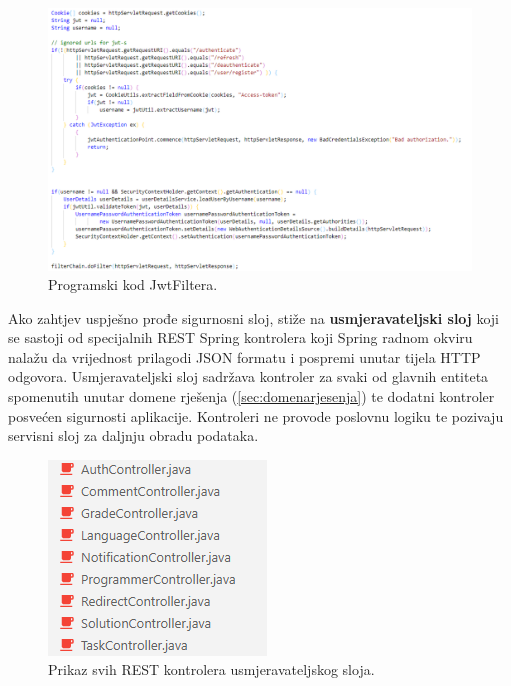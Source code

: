 \documentclass[times, utf8, zavrsni, numeric]{fer}
\begin{document}
	 		\begin{figure}[H]
	 			\centering
	 			\includegraphics[width=\linewidth]{pictures/prikazi/JwtFilter.png}
	 			\caption{Programski kod JwtFiltera.}
	 			\label{fig:jwtfilter}
	 		\end{figure}
 		
	 		Ako zahtjev uspješno prođe sigurnosni sloj, stiže na \textbf{usmjeravateljski sloj} koji se sastoji od specijalnih REST Spring kontrolera koji Spring radnom okviru nalažu da vrijednost prilagodi JSON formatu i pospremi unutar tijela HTTP odgovora. Usmjeravateljski sloj sadržava kontroler za svaki od glavnih entiteta spomenutih unutar domene rješenja (\ref{sec:domenarjesenja}) te dodatni kontroler posvećen sigurnosti aplikacije. Kontroleri ne provode poslovnu logiku te pozivaju servisni sloj za daljnju obradu podataka. 
	 		\begin{figure}[H]
	 			\centering
	 			\includegraphics[scale=0.75]{pictures/prikazi/Controllers.png}
	 			\caption{Prikaz svih REST kontrolera usmjeravateljskog sloja.}
	 			\label{fig:controllers}
	 		\end{figure}
 		
\end{document}
